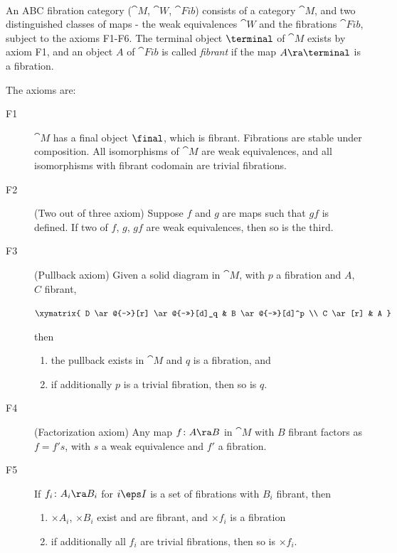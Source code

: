 \begin{defn}
\label{defn:fibcat}
\mbox{} \\
An ABC fibration category (${\cat M}$, ${\cat W}$, ${\cat Fib}$) consists of a category ${\cat M}$, and two distinguished classes of maps - the weak equivalences ${\cat W}$ and the fibrations ${\cat Fib}$, subject to the axioms F1-F6. The terminal object $\terminal$ of ${\cat M}$ exists by axiom F1, and an object $A$ of ${\cat Fib}$ is called {\it fibrant} if the map $A \ra \terminal$ is a fibration. 

The axioms are:
\begin{description}
\item[F1]
${\cat M}$ has a final object $\final$, which is fibrant. Fibrations are stable under composition. All isomorphisms of ${\cat M}$ are weak equivalences, and all isomorphisms with fibrant codomain are trivial fibrations. 

\item[F2]
(Two out of three axiom) Suppose $f$ and $g$ are maps such that $gf$ is defined. If two of $f$, $g$, $gf$ are weak equivalences, then so is the third.

\item[F3]
(Pullback axiom) Given a solid diagram in ${\cat M}$, with $p$ a fibration and $A$, $C$ fibrant,
\begin{center}
$ \xymatrix {
	D \ar@{-->}[r] \ar@{-->>}[d]_q &
	B \ar@{->>}[d]^p \\
	C \ar[r] &
	A
	}$
\end{center}
then
\begin{enumerate}
\item
the pullback exists in ${\cat M}$ and $q$ is a fibration, and
\item
if additionally $p$ is a trivial fibration, then so is $q$.
\end{enumerate}

\item[F4]
(Factorization axiom) Any map $f \colon A \ra B$ in ${\cat M}$ with $B$ fibrant factors as $f = f's$, with $s$ a weak equivalence and $f'$  a fibration.

\item[F5]
If $f_i \colon A_i \ra B_i$ for $i \eps I$ is a set of fibrations with $B_i$ fibrant, then 
\begin{enumerate}
\item
$\times A_i$, $\times B_i$ exist and are fibrant, and $\times f_i$ is a fibration
\item
if additionally all $f_i$ are trivial fibrations, then so is $\times f_i$.
\end{enumerate}


\end{description}
\end{defn}
